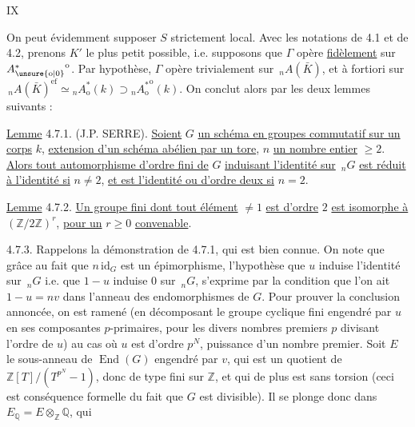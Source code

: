 \hfill IX

On peut évidemment supposer $S$ strictement local. Avec les notations de 4.1 et de 4.2, prenons $K'$ le plus petit possible, i.e.
supposons que $\Gamma$ opère \uline{fidèlement} sur ${A^{*}_{\unsure{\mathrm o|0}}}^{\mathrm o}$. Par hypothèse, $\Gamma$ opère
trivialement sur $\,{}_nA(\bar K)$, et à fortiori sur $\,{}_nA(\bar K)^{\mathrm{ef}}\simeq{}_nA^*_{\mathrm o}(k)\supset{}_n{A_{\mathrm o}^{*}}^{\mathrm o}(k)$. On conclut alors par les deux lemmes suivants :

\uline{Lemme} 4.7.1. (J.P. SERRE). \uline{Soient} $G$ \uline{un schéma en groupes commutatif sur un corps} $k$, \uline{extension d'un schéma abélien par un tore}, $n$ \uline{un nombre entier} $\geq2$. \uline{Alors tout automorphisme d'ordre fini de} $G$ \uline{induisant l'identité sur} $\,{}_nG$ \uline{est réduit à l'identité si} $n\ne2$, \uline{et est l'identité ou d'ordre deux si} $n=2$.

\uline{Lemme} 4.7.2. \uline{Un groupe fini dont tout élément} $\ne1$ \uline{est d'ordre} $2$ \uline{est isomorphe à} $(\mathbb Z/2\mathbb Z)^r$, \uline{pour un} $r\geq0$ \uline{convenable}.

4.7.3. Rappelons la démonstration de 4.7.1, qui est bien connue. On note que grâce au fait que $n\,\mathrm{id}_G$ est un épimorphisme,
l'hypothèse que $u$ induise l'identité sur $\,{}_nG$ i.e. que $1-u$ induise $0$ sur $\,{}_nG$, s'exprime par la condition que l'on ait $1-u=nv$ dans l'anneau des endomorphismes de $G$.
Pour prouver la conclusion annoncée, on est ramené (en décomposant le groupe cyclique fini engendré par $u$ en ses composantes $p$-primaires, pour les divers nombres premiers $p$ divisant l'ordre de $u$)
au cas où $u$ est d'ordre $p^N$, puissance d'un nombre premier.
Soit $E$ le sous-anneau de $\operatorname{End}(G)$
engendré par $v$, qui est un quotient de $\mathbb Z[T]/(T^{p^N}-1)$, donc de type fini sur $\mathbb Z$, et qui de plus est sans torsion (ceci est conséquence formelle du fait que $G$ est divisible).
Il se plonge donc dans $E_{\mathbb Q}=E\otimes_{\mathbb Z}\mathbb Q$, qui
